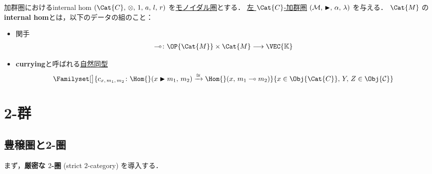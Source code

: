 \documentclass[TQFT_main]{subfiles}
\begin{document}
\begin{mydef}[label=def:internal-hom,breakable]{加群圏におけるinternal hom}
    $(\Cat{C},\, \otimes,\, 1,\, a,\, l,\, r)$ を\hyperref[redef:monoidal-category]{モノイダル圏}とする．
    \hyperref[def:modulecat]{左 $\Cat{C}$-加群圏} $(\mathcal{M},\, \blacktriangleright,\, \alpha,\, \lambda)$ を与える．
    $\Cat{M}$ の\textbf{internal hom}とは，以下のデータの組のこと：
    \begin{itemize}
        \item 関手
        \begin{align}
            \multimap \colon \OP{\Cat{M}} \times \Cat{M} \lto \VEC{\mathbb{K}}
        \end{align}
        \item 
        \textbf{currying}と呼ばれる\hyperref[def:nat]{自然同型}
        \begin{align}
            \Familyset[\big]{c_{x,\, m_1,\, m_2} \colon \Hom{}(x \btr m_1,\, m_2) \xrightarrow{\cong} \Hom{}(x,\, m_1 \multimap m_2)}{x \in \Obj{\Cat{C}},\, Y,\, Z \in \Obj{\mathcal{C}}}
        \end{align}
    \end{itemize}    
\end{mydef}


\section{2-群}

\subsection{豊穣圏と2-圏}

まず，\textbf{厳密な $2$-圏} (strict $2$-category) を導入する．
\end{document}
